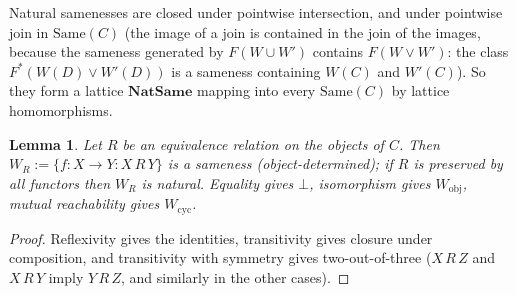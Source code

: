 \documentclass[11pt]{amsart}
\newtheorem{lem}[thm]{Lemma}
\theoremstyle{definition}
\newcommand{\Same}{\mathrm{Same}}
\newcommand{\Wcyc}{W_{\mathrm{cyc}}}
\newcommand{\Wobj}{W_{\mathrm{obj}}}
\begin{document}
Natural samenesses are closed under pointwise intersection, and under
pointwise join in $\Same(C)$ (the image of a join is contained in the join
of the images, because the sameness generated by $F(W\cup W')$ contains
$F(W\vee W')$: the class $F^*(W(D)\vee W'(D))$ is a sameness containing $W(C)$
and $W'(C)$). So they form a lattice $\mathbf{NatSame}$ mapping into every
$\Same(C)$ by lattice homomorphisms.

\begin{lem}\label{lem:objdet}
Let $R$ be an equivalence relation on the objects of $C$. Then
$W_R:=\{f\colon X\to Y: X\,R\,Y\}$ is a sameness (\emph{object-determined}); if
$R$ is preserved by all functors then $W_R$ is natural. Equality gives
$\bot$, isomorphism gives $\Wobj$, mutual reachability gives $\Wcyc$.
\end{lem}
\begin{proof}
Reflexivity gives the identities, transitivity gives closure under
composition, and transitivity with symmetry gives two-out-of-three
($X\,R\,Z$ and $X\,R\,Y$ imply $Y\,R\,Z$, and similarly in the other cases).
\end{proof}
\end{document}
